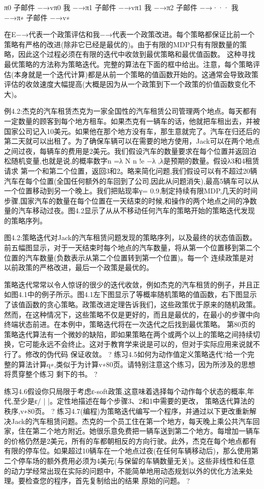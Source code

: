 π0
子邮件
−→vπ0
我
−→π1
子邮件
−→vπ1
我
−→π2
子邮件
−→···
我
−→π∗
子邮件
−→v∗

在E−→代表一个政策评估和我−→代表一个政策改进。每个策略都保证比前一个策略有严格的改进(除非它已经是最优的)。由于有限的MDP只有有限数量的策略，因此这个过程必须在有限的迭代中收敛到最优策略和最优值函数。
这种寻找最优策略的方法称为策略迭代。完整的算法在下面的框中给出。注意，每个策略评估(本身就是一个迭代计算)都是从前一个策略的值函数开始的。这通常会导致政策评估的收敛速度大幅提高(大概是因为从一个政策到下一个政策的价值函数变化不大)。

例4.2:杰克的汽车租赁杰克为一家全国性的汽车租赁公司管理两个地点。每天都有一定数量的顾客到每个地方租车。如果杰克有一辆车的话，他就把车租出去，并被国家公司记入10美元。如果他在那个地方没有车，那生意就完了。汽车在归还后的第二天就可以出租了。为了确保车辆可以在需要的地方使用，Jack可以在两个地点之间过夜，每辆车的费用是2美元。我们假设汽车的数量要求在每个位置并返回泊松随机变量,也就是说,的概率数字n =λ
N
n !e
−λ
,λ是预期的数量。假设λ3和4租赁请求
第一个和第二个位置，返回3和2。略来简化问题,我们假设可以有不超过20辆汽车在每个位置(全国任何额外的车回到了公司,因此从问题消失),最高5辆车可以从一个位置移动到另一个晚上。我们把贴现率γ= 0.9,制定持续有限MDP,几天的时间步骤,国家汽车的数量在每个位置在一天结束的时候,和操作的两个地点之间的净数量的汽车移动过夜。图4.2显示了从从不移动任何汽车的策略开始的策略迭代发现的策略序列。


图4.2:策略迭代对Jack的汽车租赁问题发现的策略序列，以及最终的状态值函数。前五幅图显示，对于一天结束时每个地点的汽车数量，将从第一个位置移到第二个位置的汽车数量(负数表示从第二个位置转到第一个位置)。每一个
连续政策是对以前政策的严格改进，最后一个政策是最优的。

策略迭代常常以令人惊讶的很少的迭代收敛，例如杰克的汽车租赁的例子，并且正如图4.1中的例子所示。图4.1左下图显示了等概率随机策略的值函数，右下图显示了该值函数的贪心策略。政策改进定理告诉我们，这些政策优于原来的随机政策。然而，在这种情况下，这些策略不仅是更好的，而且是最优的，在最小的步骤中向终端状态前进。在本例中，策略迭代将在一次迭代之后找到最优策略。
第80页的策略迭代算法有一个微妙的缺陷，即如果策略在两个或两个以上的策略之间持续切换，它可能永远不会终止。这对于教育学来说是可以的，但对于实际应用来说就不行了。修改的伪代码
保证收敛。 					?
练习4.5如何为动作值定义策略迭代?给一个完整的算法计算q∗,类似于为计算v∗80页。请特别注意这个练习，因为所涉及的思想将贯穿整个练习
剩下的书。 					?

练习4.6假设你只局限于考虑ε-soft政策,这意味着选择每个动作每个状态的概率,年代,至少是ε/ | |。定性地描述在每个步骤3、2和1中需要的更改，
策略迭代算法的秩序,v∗80页。 					?
练习4.7(编程)为策略迭代编写一个程序，并通过以下更改重新解决Jack的汽车租赁问题。杰克的一个员工住在第一个地方，每天晚上乘公共汽车回家，住在第二个地方附近。她很乐意免费把一辆车送到第二个地方。每增加一辆车的价格仍然是2美元，所有的车都朝相反的方向行驶。此外，杰克在每个地点都有有限的停车位。如果超过10辆车在一个地点过夜(在任何车辆移动后)，那么使用第二个停车场的额外费用必须为4美元(与保留的车辆数量无关)。这些非线性和任意的动力学经常出现在实际的问题中，不能简单地用动态规划以外的优化方法来处理。要检查您的程序，首先复制给出的结果
原始的问题。 					?

